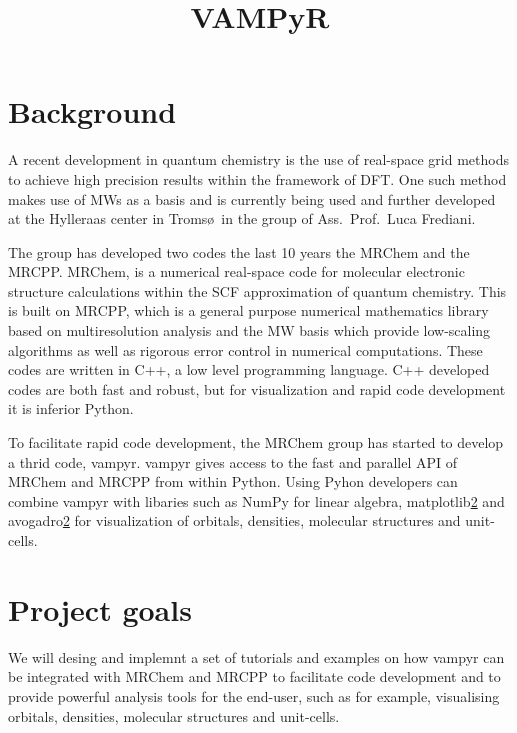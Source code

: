 \documentclass[12pt]{article}
\begin{document}
\title{VAMPyR}

\maketitle

\section{Background}

A recent development in quantum chemistry is the use of real-space grid
methods to achieve high precision results within the framework of
\ac{DFT}. One such method makes use of \acp{MW} as a
basis\cite{harrison2003multiresolution}
and is currently being used and further developed at the Hylleraas
center in Troms\o \, in the group of Ass.~Prof.~Luca Frediani.

The group has developed two codes the last 10 years the \ac{MRChem}\cite{mrchem} and
the \ac{MRCPP}\cite{mrcpp}.
\ac{MRChem}, is
a numerical real-space code for molecular electronic structure calculations
within the \ac{SCF} approximation of quantum chemistry. This is built on
\ac{MRCPP}, which is a general purpose numerical mathematics library
based on multiresolution analysis and the \ac{MW} basis which provide
low-scaling algorithms as well as rigorous error control in numerical
computations. These codes are written in C++, a low level programming language.
C++ developed codes are both fast and robust, but for visualization and
rapid code development it is inferior Python.

To facilitate rapid code development,
the \ac{MRChem} group has started to develop a thrid code,
\ac{vampyr}\cite{vampyr}. \ac{vampyr} gives access to the
fast and parallel \ac{API}
of \ac{MRChem} and \ac{MRCPP} from within Python. Using Pyhon developers can
combine \ac{vampyr} with libaries such as NumPy for linear algebra, matplotlib\ref{}
and avogadro\ref{} for visualization of orbitals, densities, molecular structures
and unit-cells.

\section{Project goals}

We will desing and implemnt a set of tutorials and examples on how
\ac{vampyr} can be integrated with \ac{MRChem} and \ac{MRCPP} to
facilitate code development and to provide powerful analysis tools for
the end-user, such as for example, visualising orbitals, densities, molecular structures and unit-cells.
\end{document}
